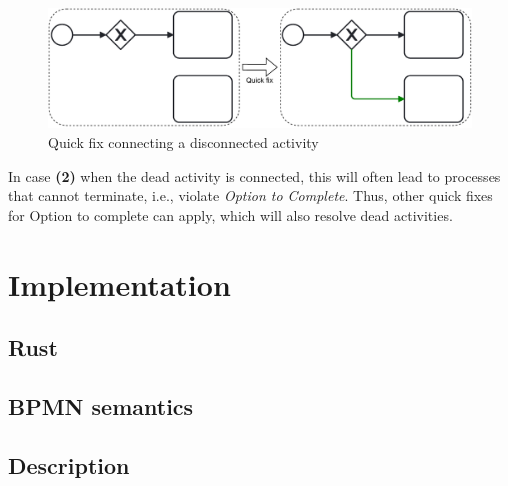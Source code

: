 \documentclass[runningheads]{llncs}
\begin{document}
\begin{figure}[ht]
	\centering
	\includegraphics[width=1\textwidth]{images/dead}
	\caption{Quick fix connecting a disconnected activity}
	\label{fig:noDeadActivitiesQuickFix}
\end{figure}

In case \textbf{(2)} when the dead activity is connected, this will often lead to processes that cannot terminate, i.e., violate \textit{Option to Complete}.
Thus, other quick fixes for Option to complete can apply, which will also resolve dead activities.

\section{Implementation}

\subsection{Rust}

\subsection{BPMN semantics}

\subsection{Description}
\cite{camundaservicesgmbhBpmnjs2023}
\end{document}
